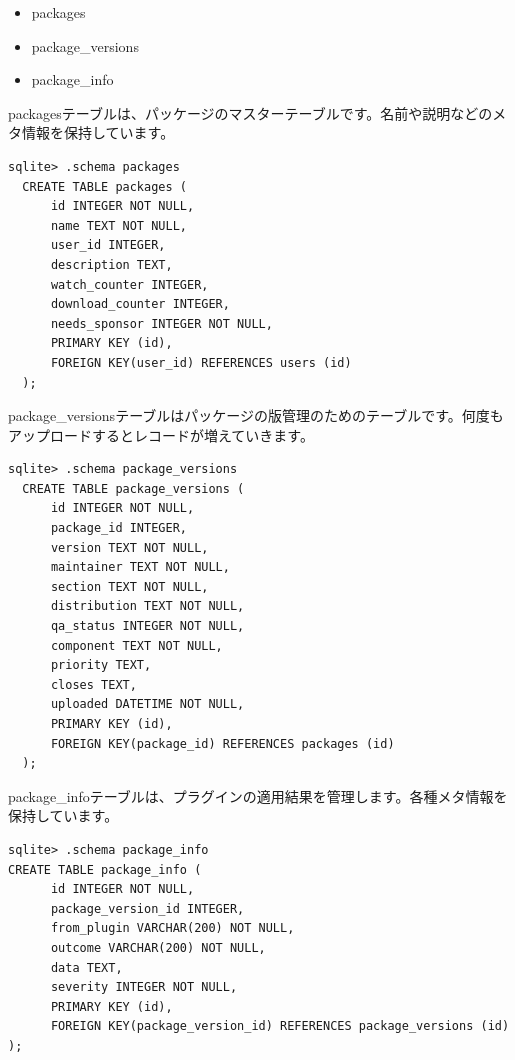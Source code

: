 \documentclass[mingoth,a4paper]{jsarticle}
\begin{document}
\begin{itemize}
  \item packages
  \item package\_versions
  \item package\_info
\end{itemize}

packagesテーブルは、パッケージのマスターテーブルです。名前や説明などのメタ情報を保持しています。

\begin{screen}
\begin{verbatim}
sqlite> .schema packages
  CREATE TABLE packages (
      id INTEGER NOT NULL,
      name TEXT NOT NULL,
      user_id INTEGER,
      description TEXT,
      watch_counter INTEGER,
      download_counter INTEGER,
      needs_sponsor INTEGER NOT NULL,
      PRIMARY KEY (id),
      FOREIGN KEY(user_id) REFERENCES users (id)
  );
\end{verbatim}
\end{screen}

package\_versionsテーブルはパッケージの版管理のためのテーブルです。何度もアップロードするとレコードが増えていきます。

\begin{screen}
\begin{verbatim}
sqlite> .schema package_versions
  CREATE TABLE package_versions (
      id INTEGER NOT NULL,
      package_id INTEGER,
      version TEXT NOT NULL,
      maintainer TEXT NOT NULL,
      section TEXT NOT NULL,
      distribution TEXT NOT NULL,
      qa_status INTEGER NOT NULL,
      component TEXT NOT NULL,
      priority TEXT,
      closes TEXT,
      uploaded DATETIME NOT NULL,
      PRIMARY KEY (id),
      FOREIGN KEY(package_id) REFERENCES packages (id)
  );
\end{verbatim}
\end{screen}

package\_infoテーブルは、プラグインの適用結果を管理します。各種メタ情報を保持しています。

\begin{screen}
\begin{verbatim}
sqlite> .schema package_info
CREATE TABLE package_info (
      id INTEGER NOT NULL,
      package_version_id INTEGER,
      from_plugin VARCHAR(200) NOT NULL,
      outcome VARCHAR(200) NOT NULL,
      data TEXT,
      severity INTEGER NOT NULL,
      PRIMARY KEY (id),
      FOREIGN KEY(package_version_id) REFERENCES package_versions (id)
);
\end{verbatim}
\end{screen}
\end{document}
